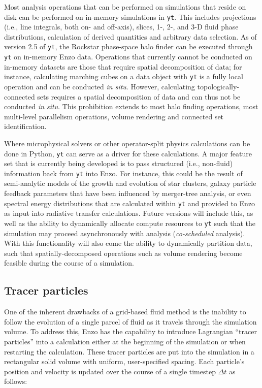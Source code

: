 Most analysis operations that can be performed on simulations that reside on
disk can be performed on in-memory simulations in \texttt{yt}.  This includes
projections (i.e., line integrals, both on- and off-axis), slices, 1-, 2-, and
3-D fluid phase distributions, calculation of derived quantities and arbitrary
data selection.  As of version 2.5 of \texttt{yt},  the Rockstar phase-space
halo finder \citep{2013ApJ...762..109B} can be executed through \texttt{yt} on
in-memory Enzo data.  Operations that currently cannot be conducted on
in-memory datasets are those that require spatial decomposition of data; for
instance, calculating marching cubes on a data object with \texttt{yt} is a
fully local operation and can be conducted \textit{in situ}.  However,
calculating topologically-connected sets requires a spatial decomposition of
data and can thus not be conducted \textit{in situ}.  This prohibition extends
to most halo finding operations, most multi-level parallelism operations,
volume rendering and connected set identification.

Where microphysical solvers or other operator-split physics calculations can be
done in Python, \texttt{yt} can serve as a driver for these calculations.  A
major feature set that is currently being developed is to pass structured
(i.e., non-fluid) information back from \texttt{yt} into Enzo.  For instance,
this could be the result of semi-analytic models of the growth and evolution of
star clusters, galaxy particle feedback parameters that have been influenced by
merger-tree analysis, or even spectral energy distributions that are calculated
within \texttt{yt} and provided to Enzo as input into radiative transfer
calculations.  Future versions will include this, as well as the ability to
dynamically allocate compute resources to \texttt{yt} such that the simulation
may proceed asynchronously with analysis (\textit{co-scheduled} analysis).
With this functionality will also come the ability to dynamically partition
data, such that spatially-decomposed operations such as volume rendering become
feasible during the course of a simulation.

\subsection{Tracer particles}

One of the inherent drawbacks of a grid-based fluid method is the
inability to follow the evolution of a single parcel of fluid as it
travels through the simulation volume.  To address this, Enzo has the
capability to introduce Lagrangian ``tracer particles'' into a
calculation either at the beginning of the simulation or when
restarting the calculation.  These tracer particles are put into the
simulation in a rectangular solid volume with uniform, user-specified
spacing.  Each particle's position and velocity is updated over the
course of a single timestep $\Delta t$ as follows:

